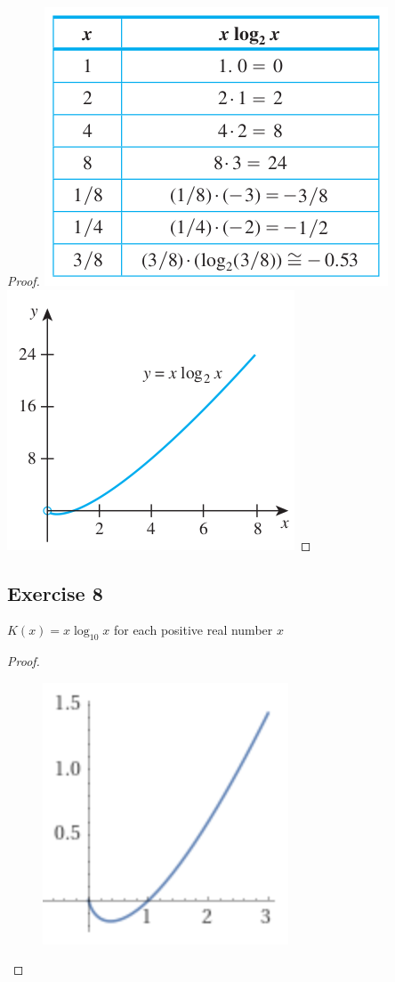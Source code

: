 \documentclass[14pt]{extarticle}
\begin{document}
\begin{proof}
    \includegraphics[scale=0.5]{../images/11.4.7.1.png}
    \includegraphics[scale=0.5]{../images/11.4.7.2.png}
\end{proof}

\subsection{Exercise 8}
\(K(x) = x \log_{10} x\) for each positive real number \(x\)

\begin{proof}
    \begin{figure}[ht!]
        \centering
        \includegraphics[scale=0.5]{../images/11.4.8.png}
    \end{figure}
\end{proof}
\end{document}
